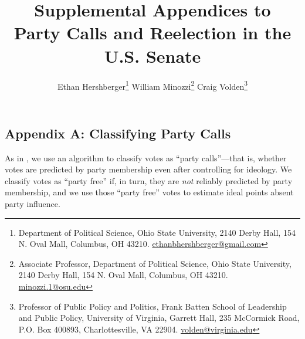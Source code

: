 \documentclass[12pt]{article}
\begin{document}
\doublespacing

\setcounter{table}{0}
\setcounter{footnote}{0}
\setcounter{figure}{0}
\setcounter{page}{0}



\title{
{\Large Supplemental Appendices to\\}
{\LARGE Party Calls and Reelection in the U.S. Senate}}


\author{\large
Ethan Hershberger\footnote{
  \small Department of Political Science,
  Ohio State University, 2140 Derby Hall, 154 N. Oval Mall, Columbus, OH 43210.
  \href{mailto:ethanbhershberger@gmail.com}{ethanbhershberger@gmail.com}
}\quad
William Minozzi\footnote{
  \small Associate Professor, Department of Political Science,
  Ohio State University, 2140 Derby Hall, 154 N. Oval Mall, Columbus, OH 43210.
  \href{mailto:minozzi.1@osu.edu}{minozzi.1@osu.edu}
}\quad
Craig Volden\footnote{
  \small Professor of Public Policy and Politics, Frank Batten School of
  Leadership and Public Policy,
  University of Virginia, Garrett Hall, 235 McCormick Road, P.O. Box 400893,
  Charlottesville, VA 22904.
  \href{mailto:volden@virginia.edu}{volden@virginia.edu}
}\\
}

\maketitle

\thispagestyle{empty}

\setcounter{tocdepth}{1}
\setcounter{secnumdepth}{0}
\tableofcontents

\renewcommand\thetable{A\arabic{table}}
\renewcommand\thepage{A\arabic{page}}

\clearpage

\subsection*{Appendix A: Classifying Party Calls}
%

As in \cite{Minozzi:2013}, we use an algorithm to classify votes as
``party calls''---that is, whether votes are predicted by party membership even
after controlling for ideology.
We classify votes as ``party free'' if, in turn, they are \textit{not} reliably
predicted by party membership, and we use those ``party free'' votes to
estimate ideal points absent party influence.
\end{document}
